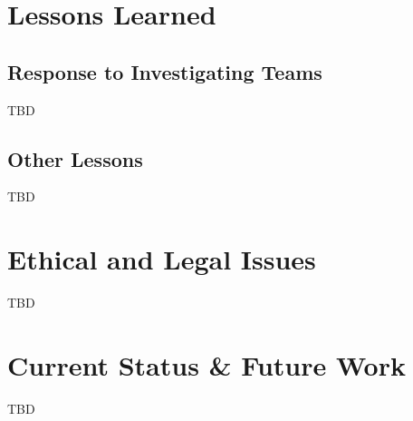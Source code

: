 \documentclass[sigconf]{acmart}
\begin{document}
\section{Lessons Learned}
\label{lessons learned}

\subsection{Response to Investigating Teams}
\label{response}
TBD

\subsection{Other Lessons}
\label{other lessons}
TBD

\section{Ethical and Legal Issues}
\label{ethics-legal}

TBD

\section{Current Status \& Future Work}
\label{current status and future work}

TBD

\end{document}
